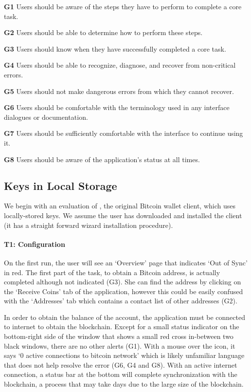 \begin{compactlist}
	\item[\bf G1] Users should be aware of the steps they have to perform to complete a core task.
	\item[\bf G2] Users should be able to determine how to perform these steps.
	\item[\bf G3] Users should know when they have successfully completed a core task.
	\item[\bf G4] Users should be able to recognize, diagnose, and recover from non-critical errors.
	\item[\bf G5] Users should not make dangerous errors from which they cannot recover.
	\item[\bf G6] Users should be comfortable with the terminology used in any interface dialogues or documentation.
	\item[\bf G7] Users should be sufficiently comfortable with the interface to continue using it.
	\item[\bf G8] Users should be aware of the application's status at all times.
\end{compactlist}


\subsection{Keys in Local Storage}

We begin with an evaluation of \bitcoinclient, the original Bitcoin wallet client, which uses locally-stored keys. We assume the user has downloaded and installed the \bitcoinclient client (it has a straight forward wizard installation procedure).

\paragraph{T1: Configuration} 

On the first run, the user will see an `Overview' page that indicates `Out of Sync' in red. The first part of the task, to obtain a Bitcoin address, is actually completed although not indicated (G3). She can find the address by clicking on the `Receive Coins' tab of the application, however this could be easily confused with the `Addresses' tab which contains a contact list of other addresses (G2).

In order to obtain the balance of the account, the application must be connected to internet to obtain the blockchain. Except for a small status indicator on the bottom-right side of the window that shows a small red cross in-between two black windows, there are no other alerts (G1). With a mouse over the icon, it says `0 active connections to bitcoin network' which is likely unfamiliar language that does not help resolve the error (G6, G4 and G8). With an active internet connection, a status bar at the bottom will complete synchronization with the blockchain, a process that may take days due to the large size of the blockchain. 


